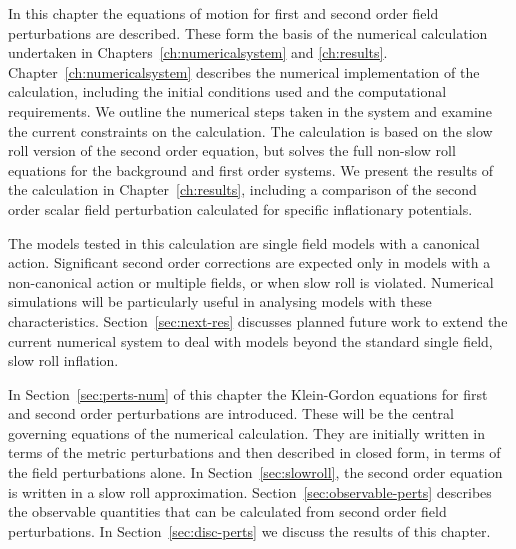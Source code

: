 In this chapter the equations of motion for first and second order field
perturbations are described. These form the basis of the numerical calculation
undertaken in Chapters~\ref{ch:numericalsystem} and \ref{ch:results}.
Chapter~\ref{ch:numericalsystem} describes the numerical implementation of the
calculation, including the initial conditions used and the
computational requirements. We outline the numerical steps
taken in the system and examine the current constraints
on the calculation. The calculation is based on the slow roll version of the second
order equation, but solves the full non-slow roll equations for the
background and first order systems.
% 
We present the results of the calculation
in Chapter~\ref{ch:results}, including a comparison of the second
order scalar field perturbation calculated for specific inflationary potentials. 

%
% 
The models tested in this calculation are single field models with a canonical
action. Significant second order corrections
are expected only in models with a non-canonical action or multiple fields, or
when slow roll is violated. Numerical simulations will be particularly
useful in analysing models with these characteristics.
Section~\ref{sec:next-res} discusses planned future work to extend the current
numerical system to deal with models beyond the standard single field, slow
roll inflation.


In Section~\ref{sec:perts-num} of this chapter the Klein-Gordon equations
for first and second order perturbations are introduced. These will be the central
governing equations of the numerical calculation. They are
initially written in
terms of the metric perturbations and
then described in closed form, \iec in terms of the field perturbations
alone. In
Section~\ref{sec:slowroll}, the second order equation is written in a slow roll
approximation.
% 
Section~\ref{sec:observable-perts} describes the observable quantities that can be
calculated from second order field perturbations. In Section~\ref{sec:disc-perts} we
discuss the results of this chapter.




